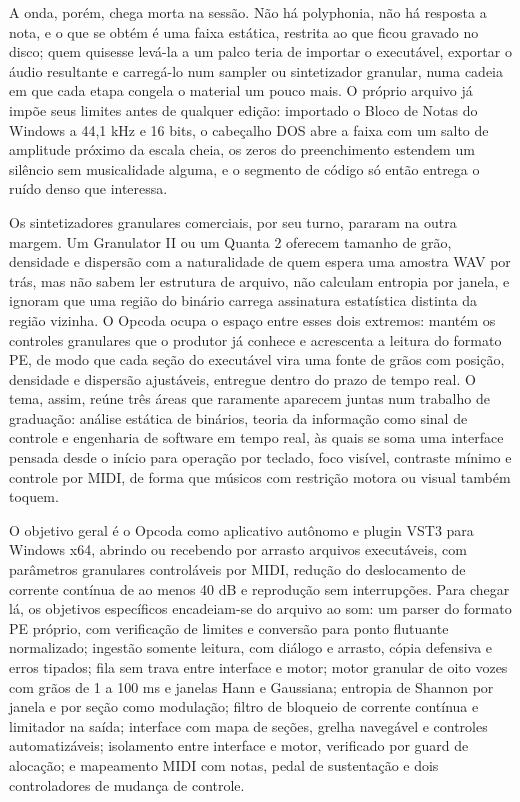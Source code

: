 \documentclass[11pt,a4paper]{article}
\begin{document}
A onda, porém, chega morta na sessão. Não há polyphonia, não há resposta a nota, e o que se obtém é uma faixa estática, restrita ao que ficou gravado no disco; quem quisesse levá-la a um palco teria de importar o executável, exportar o áudio resultante e carregá-lo num sampler ou sintetizador granular, numa cadeia em que cada etapa congela o material um pouco mais. O próprio arquivo já impõe seus limites antes de qualquer edição: importado o Bloco de Notas do Windows a 44,1 kHz e 16 bits, o cabeçalho DOS abre a faixa com um salto de amplitude próximo da escala cheia, os zeros do preenchimento estendem um silêncio sem musicalidade alguma, e o segmento de código só então entrega o ruído denso que interessa.


Os sintetizadores granulares comerciais, por seu turno, pararam na outra margem. Um Granulator II ou um Quanta 2 oferecem tamanho de grão, densidade e dispersão com a naturalidade de quem espera uma amostra WAV por trás, mas não sabem ler estrutura de arquivo, não calculam entropia por janela, e ignoram que uma região do binário carrega assinatura estatística distinta da região vizinha. O Opcoda ocupa o espaço entre esses dois extremos: mantém os controles granulares que o produtor já conhece e acrescenta a leitura do formato PE, de modo que cada seção do executável vira uma fonte de grãos com posição, densidade e dispersão ajustáveis, entregue dentro do prazo de tempo real. O tema, assim, reúne três áreas que raramente aparecem juntas num trabalho de graduação: análise estática de binários, teoria da informação como sinal de controle e engenharia de software em tempo real, às quais se soma uma interface pensada desde o início para operação por teclado, foco visível, contraste mínimo e controle por MIDI, de forma que músicos com restrição motora ou visual também toquem.


O objetivo geral é o Opcoda como aplicativo autônomo e plugin VST3 para Windows x64, abrindo ou recebendo por arrasto arquivos executáveis, com parâmetros granulares controláveis por MIDI, redução do deslocamento de corrente contínua de ao menos 40 dB e reprodução sem interrupções. Para chegar lá, os objetivos específicos encadeiam-se do arquivo ao som: um parser do formato PE próprio, com verificação de limites e conversão para ponto flutuante normalizado; ingestão somente leitura, com diálogo e arrasto, cópia defensiva e erros tipados; fila sem trava entre interface e motor; motor granular de oito vozes com grãos de 1 a 100 ms e janelas Hann e Gaussiana; entropia de Shannon por janela e por seção como modulação; filtro de bloqueio de corrente contínua e limitador na saída; interface com mapa de seções, grelha navegável e controles automatizáveis; isolamento entre interface e motor, verificado por guard de alocação; e mapeamento MIDI com notas, pedal de sustentação e dois controladores de mudança de controle.
\end{document}
